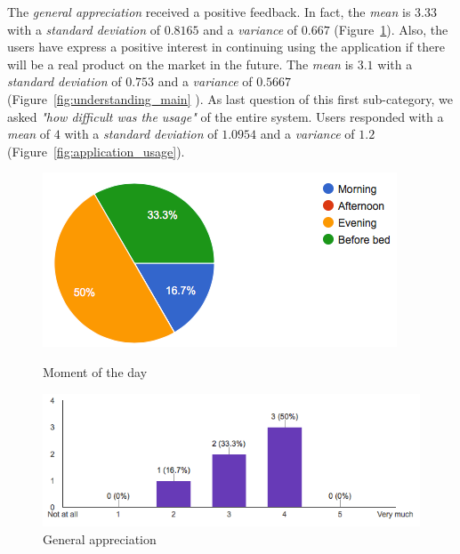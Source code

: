 \noindent The \textit{general appreciation} received a positive feedback. In fact, the \textit{mean} is $3.33$ with a \textit{standard deviation} of $0.8165$ and a \textit{variance} of $0.667$ (Figure~\ref{fig:application_liked}). Also, the users have express a positive interest in continuing using the application if there will be a real product on the market in the future. The \textit{mean} is $3.1$ with a \textit{standard deviation} of $0.753$ and a \textit{variance} of $0.5667$ (Figure~\ref{fig:understanding_main} ). As last question of this first sub-category, we asked \textit{"how difficult was the usage"} of the entire system. Users responded with a \textit{mean} of $4$ with a \textit{standard deviation} of $1.0954$ and a \textit{variance} of $1.2$ (Figure~\ref{fig:application_usage}).

\begin{figure}[!ht]
	\centering
	\begin{minipage}{.5\textwidth}
		\centering
		\includegraphics[scale=0.4]{Figures/responses/application_period_of_usage.png}
		\caption{Moment of the day}
		\label{fig:application_period_of_usage}
	\end{minipage}%
	\begin{minipage}{.5\textwidth}
		\centering
		\includegraphics[scale=0.4]{Figures/responses/application_liked.png}
		\caption{General appreciation}
		\label{fig:application_liked}
	\end{minipage}%
\end{figure}


